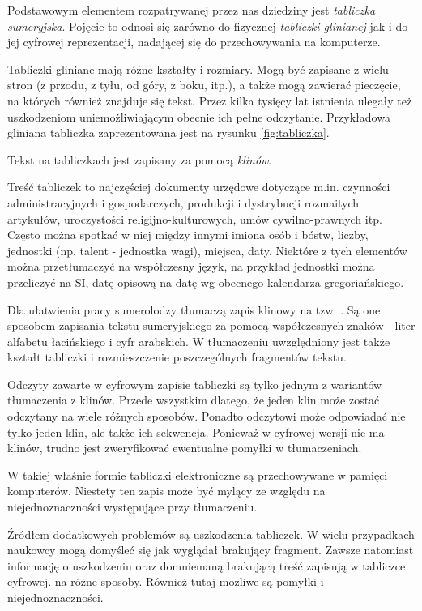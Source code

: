 Podstawowym elementem rozpatrywanej przez nas dziedziny jest \emph{tabliczka sumeryjska}. Pojęcie to odnosi się zarówno do fizycznej \emph{tabliczki glinianej} jak i do jej cyfrowej reprezentacji, nadającej się do przechowywania na komputerze. 

Tabliczki gliniane mają różne kształty i rozmiary. 
Mogą być zapisane z wielu stron (z przodu, z tyłu, od góry, z boku, itp.), a także mogą zawierać pieczęcie, na których również znajduje się tekst. Przez kilka tysięcy lat istnienia ulegały też uszkodzeniom uniemożliwiającym obecnie ich pełne odczytanie.
Przykładowa gliniana tabliczka zaprezentowana jest na rysunku \ref{fig:tabliczka}.

Tekst na tabliczkach jest zapisany za pomocą \emph{klinów}. %

Treść tabliczek to najczęściej dokumenty urzędowe dotyczące m.in. czynności administracyjnych i gospodarczych, produkcji i dystrybucji rozmaitych artykułów, uroczystości religijno-kulturowych, umów cywilno-prawnych itp.
Często można spotkać w niej między innymi imiona osób i bóstw, liczby, jednostki (np. talent - jednostka wagi), %
miejsca, daty. Niektóre z tych elementów można przetłumaczyć na współczesny język, na przykład jednostki można przeliczyć na SI, datę opisową na datę wg obecnego kalendarza gregoriańskiego. %

Dla ułatwienia pracy sumerolodzy tłumaczą zapis klinowy na tzw. . Są one sposobem zapisania tekstu sumeryjskiego za pomocą współczesnych znaków - liter alfabetu łacińskiego i cyfr arabskich. W tłumaczeniu uwzględniony jest także kształt tabliczki i rozmieszczenie poszczególnych fragmentów tekstu. %

Odczyty zawarte w cyfrowym zapisie tabliczki są tylko jednym z wariantów tłumaczenia z klinów. Przede wszystkim dlatego, że jeden klin może zostać odczytany na wiele różnych sposobów. Ponadto odczytowi może odpowiadać nie tylko jeden klin, ale także ich sekwencja. Ponieważ w cyfrowej wersji nie ma klinów, trudno jest zweryfikować ewentualne pomyłki w tłumaczeniach.

 W takiej właśnie formie tabliczki elektroniczne są przechowywane w pamięci komputerów. Niestety ten zapis może być mylący ze względu na niejednoznaczności występujące przy tłumaczeniu. 

Źródłem dodatkowych problemów są uszkodzenia tabliczek. W wielu przypadkach naukowcy mogą domyśleć się jak wyglądał brakujący fragment. Zawsze natomiast informację o uszkodzeniu oraz domniemaną brakującą treść zapisują w tabliczce cyfrowej.
 na różne sposoby. Również tutaj możliwe są pomyłki i niejednoznaczności.

